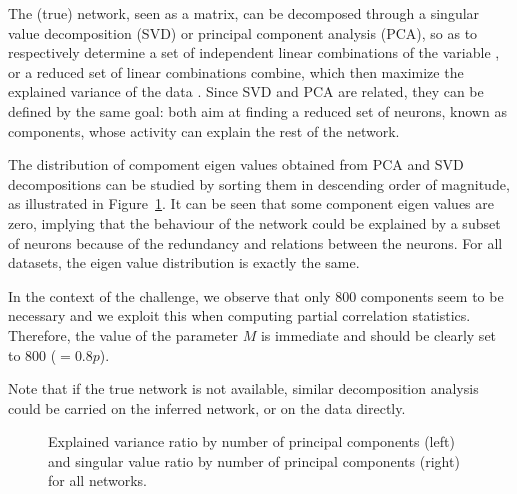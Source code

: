 \documentclass[wcp]{jmlr}
\begin{document}
The (true) network, seen as a matrix, can be decomposed through a singular value decomposition (SVD) or principal component
analysis (PCA), so as to respectively determine a set of independent linear combinations of the
variable \citep{alter2000singular}, or a reduced set of linear
combinations combine, which then maximize the explained variance of the data
\citep{jolliffe2005principal}. Since SVD and PCA are related, they can be defined by the same goal: both aim at finding a reduced set of neurons, known as components, whose activity can explain the rest of the network.

The distribution of compoment eigen values obtained from PCA and SVD decompositions can be studied by sorting them in descending order of magnitude, as illustrated in Figure~\ref{fig:pca}. It can be seen that some component eigen values are zero, implying that the behaviour of the network could be explained by a subset of neurons because of the 
redundancy and relations between the neurons. For all datasets, the eigen value distribution is exactly the same. 

In the context of the challenge, we observe that only $800$ components seem to be necessary and we exploit this when computing partial correlation statistics. Therefore, the value of the parameter $M$ is immediate and should be clearly set to $800$ ($=0.8p$).

Note that if the true network is not available, similar decomposition analysis could be carried on the inferred network, or on the data directly.


\begin{figure}[t]
\centering
{}
\caption{Explained variance ratio by number of principal components (left) and singular value ratio by number of principal components (right) for all networks.}
\label{fig:pca}
\end{figure}
\end{document}
